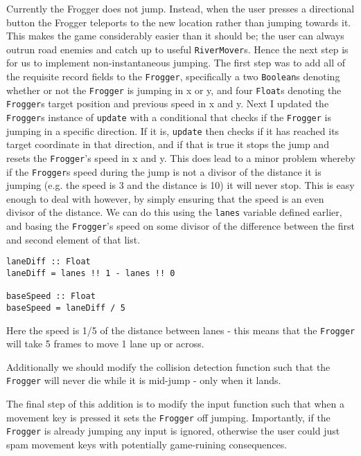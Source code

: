 \documentclass[12pt, a4paper]{report}
\begin{document}
Currently the Frogger does not jump.
Instead, when the user presses a directional button the Frogger teleports to the new location rather than jumping towards it.
This makes the game considerably easier than it should be; the user can always outrun road enemies and catch up to useful \verb|RiverMover|s.
Hence the next step is for us to implement non-instantaneous jumping.
The first step was to add all of the requisite record fields to the \verb|Frogger|, specifically a two \verb|Boolean|s denoting whether or not the \verb|Frogger| is jumping in x or y, and four \verb|Float|s denoting the \verb|Frogger|s target position and previous speed in x and y.
Next I updated the \verb|Frogger|s instance of \verb|update| with a conditional that checks if the \verb|Frogger| is jumping in a specific direction.
If it is, \verb|update| then checks if it has reached its target coordinate in that direction, and if that is true it stops the jump and resets the \verb|Frogger|'s speed in x and y.
This does lead to a minor problem whereby if the \verb|Frogger|s speed during the jump is not a divisor of the distance it is jumping (e.g. the speed is 3 and the distance is 10) it will never stop.
This is easy enough to deal with however, by simply ensuring that the speed is an even divisor of the distance.
We can do this using the \verb|lanes| variable defined earlier, and basing the \verb|Frogger|'s speed on some divisor of the difference between the first and second element of that list.

\begin{lstlisting}
laneDiff :: Float
laneDiff = lanes !! 1 - lanes !! 0

baseSpeed :: Float
baseSpeed = laneDiff / 5
\end{lstlisting}

Here the speed is 1/5 of the distance between lanes - this means that the \verb|Frogger| will take 5 frames to move 1 lane up or across.

\par

Additionally we should modify the collision detection function such that the \verb|Frogger| will never die while it is mid-jump - only when it lands.

\par

The final step of this addition is to modify the input function such that when a movement key is pressed it sets the \verb|Frogger| off jumping.
Importantly, if the \verb|Frogger| is already jumping any input is ignored, otherwise the user could just spam movement keys with potentially game-ruining consequences.
\end{document}
